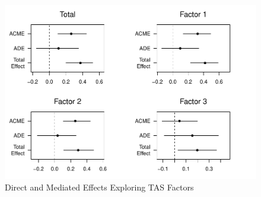 \documentclass[
  man,floatsintext]{apa7}
\begin{document}
\begin{figure}
\includegraphics[width=1\linewidth]{HalversonAnnaliseMAPSSThesis2024_files/figure-latex/mediation-plot-1} \caption{Direct and Mediated Effects Exploring TAS Factors}\label{fig:mediation-plot}
\end{figure}
\end{document}

